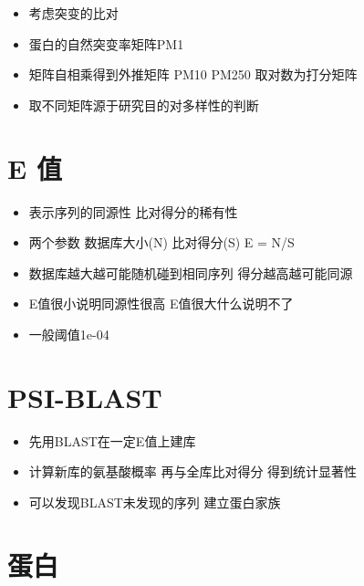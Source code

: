 \documentclass[
]{book}
\providecommand{\tightlist}{%
  \setlength{\itemsep}{0pt}\setlength{\parskip}{0pt}}
\begin{document}
\begin{itemize}
\tightlist
\item
  考虑突变的比对
\item
  蛋白的自然突变率矩阵PM1
\item
  矩阵自相乘得到外推矩阵 PM10 PM250 取对数为打分矩阵
\item
  取不同矩阵源于研究目的对多样性的判断
\end{itemize}

\hypertarget{e-ux503c}{%
\section{E 值}\label{e-ux503c}}

\begin{itemize}
\tightlist
\item
  表示序列的同源性 比对得分的稀有性
\item
  两个参数 数据库大小(N) 比对得分(S) E = N/S
\item
  数据库越大越可能随机碰到相同序列 得分越高越可能同源
\item
  E值很小说明同源性很高 E值很大什么说明不了
\item
  一般阈值1e-04
\end{itemize}

\hypertarget{psi-blast}{%
\section{PSI-BLAST}\label{psi-blast}}

\begin{itemize}
\tightlist
\item
  先用BLAST在一定E值上建库
\item
  计算新库的氨基酸概率 再与全库比对得分 得到统计显著性
\item
  可以发现BLAST未发现的序列 建立蛋白家族
\end{itemize}

\hypertarget{ux86cbux767d}{%
\section{蛋白}\label{ux86cbux767d}}
\end{document}
